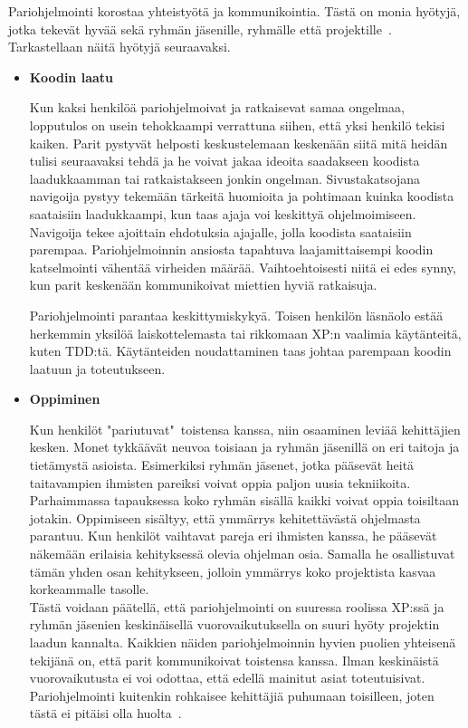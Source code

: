 \documentclass[finnish]{../tktltiki2}
\theoremstyle{definition}
\theoremstyle{remark}
\begin{document}
Pariohjelmointi korostaa yhteistyötä ja kommunikointia. Tästä on monia 
hyötyjä, jotka tekevät hyvää sekä ryhmän jäsenille, ryhmälle että 
projektille~\cite{Begel:2008:PPW:1414004.1414026}. Tarkastellaan näitä 
hyötyjä seuraavaksi. 

\begin{itemize}

\item {\bf Koodin laatu}

Kun kaksi henkilöä pariohjelmoivat ja ratkaisevat samaa ongelmaa, 
lopputulos on usein tehokkaampi verrattuna siihen, että yksi henkilö 
tekisi kaiken. Parit pystyvät helposti keskustelemaan keskenään siitä 
mitä heidän tulisi seuraavaksi tehdä ja he voivat jakaa ideoita 
saadakseen koodista laadukkaamman tai ratkaistakseen jonkin ongelman. 
Sivustakatsojana navigoija pystyy tekemään tärkeitä huomioita ja 
pohtimaan kuinka koodista saataisiin laadukkaampi, kun taas ajaja voi 
keskittyä ohjelmoimiseen. Navigoija tekee ajoittain ehdotuksia 
ajajalle, jolla koodista saataisiin parempaa.
Pariohjelmoinnin ansiosta tapahtuva laajamittaisempi koodin 
katselmointi vähentää virheiden määrää. Vaihtoehtoisesti
niitä ei edes synny, kun parit keskenään kommunikoivat miettien hyviä 
ratkaisuja.

Pariohjelmointi parantaa keskittymiskykyä. Toisen henkilön 
läsnäolo estää herkemmin yksilöä laiskottelemasta tai rikkomaan XP:n
vaalimia käytänteitä, kuten TDD:tä. Käytänteiden noudattaminen taas 
johtaa parempaan koodin laatuun ja toteutukseen.

\item {\bf Oppiminen}

Kun henkilöt "pariutuvat"~toistensa kanssa, niin osaaminen 
leviää kehittäjien kesken. Monet tykkäävät neuvoa toisiaan ja ryhmän 
jäsenillä
on eri taitoja ja tietämystä asioista. Esimerkiksi ryhmän jäsenet, 
jotka pääsevät heitä taitavampien ihmisten pareiksi voivat oppia
paljon uusia tekniikoita. Parhaimmassa tapauksessa koko ryhmän sisällä 
kaikki voivat oppia toisiltaan jotakin.
Oppimiseen sisältyy, että ymmärrys kehitettävästä ohjelmasta 
parantuu. Kun henkilöt vaihtavat
pareja eri ihmisten kanssa, he pääsevät näkemään erilaisia 
kehityksessä olevia ohjelman osia. Samalla he osallistuvat tämän 
yhden osan
kehitykseen, jolloin ymmärrys koko projektista kasvaa korkeammalle 
tasolle.\\

Tästä voidaan päätellä, että pariohjelmointi on suuressa roolissa 
XP:ssä ja ryhmän jäsenien keskinäisellä vuorovaikutuksella on suuri 
hyöty projektin laadun kannalta. Kaikkien näiden pariohjelmoinnin 
hyvien puolien yhteisenä tekijänä on, että parit kommunikoivat 
toistensa kanssa. Ilman keskinäistä vuorovaikutusta ei voi odottaa, 
että edellä mainitut asiat toteutuisivat. Pariohjelmointi kuitenkin 
rohkaisee kehittäjiä puhumaan toisilleen, joten tästä ei pitäisi olla 
huolta~\cite{Zarb:2012:UCW:2384716.2384738}.

\end{itemize}
\end{document}
